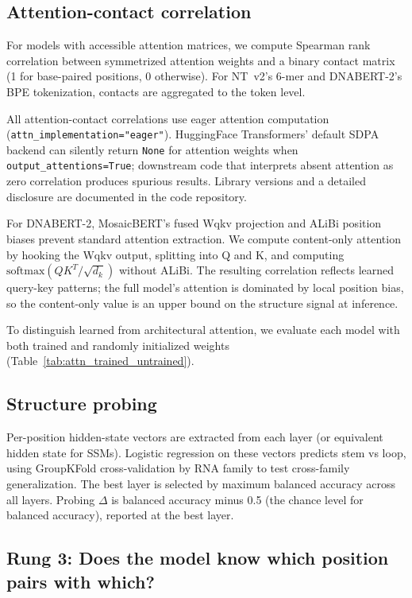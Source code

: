 \documentclass[11pt]{article}
\begin{document}
\subsection{Attention-contact correlation}
\label{sec:methods-attn}

For models with accessible attention matrices, we compute Spearman
rank correlation between symmetrized attention weights and a binary
contact matrix (1 for base-paired positions, 0 otherwise). For
NT~v2's 6-mer and DNABERT-2's BPE tokenization, contacts are
aggregated to the token level.

All attention-contact correlations use eager attention computation
(\texttt{attn\_implementation="eager"}).
HuggingFace Transformers' default SDPA backend can silently return
\texttt{None} for attention weights when
\texttt{output\_attentions=True}; downstream code that interprets
absent attention as zero correlation produces spurious results.
Library versions and a detailed disclosure are documented in the
code repository.

For DNABERT-2, MosaicBERT's fused Wqkv projection and ALiBi
position biases prevent standard attention extraction. We compute
content-only attention by hooking the Wqkv output, splitting into Q
and K, and computing
$\mathrm{softmax}(QK^T / \sqrt{d_k})$ without ALiBi. The resulting
correlation reflects learned query-key patterns; the full model's
attention is dominated by local position bias, so the
content-only value is an upper bound on the structure signal at
inference.

To distinguish learned from architectural attention, we evaluate
each model with both trained and randomly initialized weights
(Table~\ref{tab:attn_trained_untrained}).

\subsection{Structure probing}

Per-position hidden-state vectors are extracted from each layer (or
equivalent hidden state for SSMs). Logistic regression on these
vectors predicts stem vs loop, using GroupKFold cross-validation by
RNA family to test cross-family generalization. The best layer is
selected by maximum balanced accuracy across all layers. Probing
$\Delta$ is balanced accuracy minus 0.5 (the chance level for
balanced accuracy), reported at the best layer.

\subsection{Rung 3: Does the model know which position pairs with which?}
\end{document}
